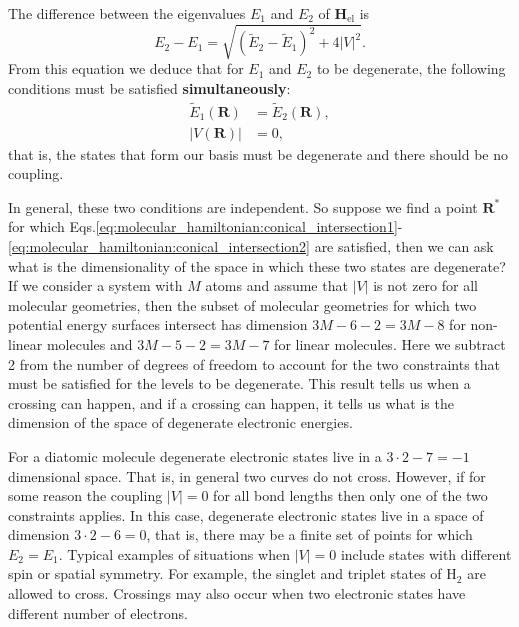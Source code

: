 \documentclass[../Main/chem532-notes.tex]{subfiles}
\begin{document}
The difference between the eigenvalues $E_1$ and $E_2$ of $\mathbf{H}_\mathrm{el}$ is
\begin{equation}
E_2 - E_1 = \sqrt{(\tilde{E}_{2}-\tilde{E}_{1})^2 + 4 |V|^2 }.
\end{equation}
From this equation we deduce that for $E_1$ and $E_2$ to be degenerate, the following conditions must be satisfied \textbf{simultaneously}:
\begin{align}
\label{eq:molecular_hamiltonian:conical_intersection1}
\tilde{E}_{1}(\mathbf{R}) &= \tilde{E}_{2}(\mathbf{R}), \\
\label{eq:molecular_hamiltonian:conical_intersection2}
|V(\mathbf{R})| &= 0,
\end{align}
that is, the states that form our basis must be degenerate and there should be no coupling.

In general, these two conditions are independent. So suppose we find a point $\mathbf{R}^*$ for which Eqs.\eqref{eq:molecular_hamiltonian:conical_intersection1}-\eqref{eq:molecular_hamiltonian:conical_intersection2} are satisfied, then we can ask what is the dimensionality of the space in which these two states are degenerate?
If we consider a system with $M$ atoms and assume that $|V|$ is not zero for all molecular geometries, then the subset of molecular geometries for which two potential energy surfaces intersect has dimension $3M - 6 - 2 = 3M - 8$ for non-linear molecules and $3M - 5 - 2 = 3M - 7$ for linear molecules.
Here we subtract 2 from the number of degrees of freedom to account for the two constraints that must be satisfied for the levels to be degenerate.
This result tells us when a crossing can happen, and if a crossing can happen, it tells us what is the dimension of the space of degenerate electronic energies.

\begin{example}
For a diatomic molecule degenerate electronic states live in a $3 \cdot 2 - 7 = -1$ dimensional space.
That is, in general two curves do not cross.
However, if for some reason the coupling $|V| = 0$ for all bond lengths then only one of the two constraints applies.
In this case, degenerate electronic states live in a space of dimension $3 \cdot 2 - 6 = 0$, that is, there may be a finite set of points for which $E_2 = E_1$.
Typical examples of situations when $|V| = 0$ include states with different spin or spatial symmetry.  For example, the singlet and triplet states of H$_2$ are allowed to cross.
Crossings may also occur when two electronic states have different number of electrons.
\end{example}
\end{document}
